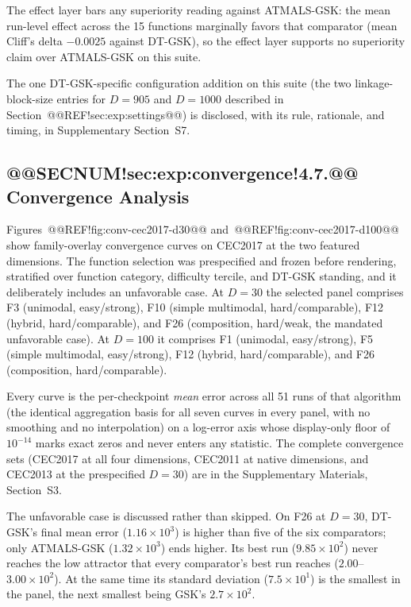 \documentclass[10pt,a4paper]{article}
\newcommand{\dtgsk}{DT-GSK}
\newcommand{\atmals}{ATMALS-GSK}
\begin{document}
The effect layer bars any superiority reading against \atmals{}: the
mean run-level effect across the 15 functions marginally favors that
comparator (mean Cliff's delta $-0.0025$ against \dtgsk{}), so the
effect layer supports no superiority claim over \atmals{} on this suite.

The one \dtgsk{}-specific configuration addition on this suite (the
two linkage-block-size entries for $D = 905$ and $D = 1000$ described in
Section~@@REF!sec:exp:settings@@) is disclosed, with its rule,
rationale, and timing, in Supplementary Section~S7.



\subsection{@@SECNUM!sec:exp:convergence!4.7.@@ Convergence Analysis}\label{sec:exp:convergence}


Figures~@@REF!fig:conv-cec2017-d30@@ and~@@REF!fig:conv-cec2017-d100@@
show family-overlay convergence curves on CEC2017 at the two featured
dimensions. The function selection was prespecified and frozen
before rendering, stratified over function category, difficulty tercile, and
\dtgsk{} standing, and it deliberately includes an unfavorable case.
At $D = 30$ the selected panel comprises F3 (unimodal, easy/strong),
F10 (simple multimodal, hard/comparable), F12 (hybrid, hard/comparable),
and F26 (composition, hard/weak, the mandated unfavorable case).
At $D = 100$ it comprises F1 (unimodal, easy/strong),
F5 (simple multimodal, easy/strong), F12 (hybrid, hard/comparable),
and F26 (composition, hard/comparable).

Every curve is the per-checkpoint \emph{mean} error across all 51
runs of that algorithm (the identical aggregation basis for all
seven curves in every panel, with no smoothing and no
interpolation) on a log-error axis whose display-only floor of
$10^{-14}$ marks exact zeros and never enters any statistic. The
complete convergence sets (CEC2017 at all four dimensions, CEC2011
at native dimensions, and CEC2013 at the prespecified $D = 30$) are
in the Supplementary Materials, Section~S3.


The unfavorable case is discussed rather than skipped. On F26 at
$D = 30$, \dtgsk{}'s final mean error ($1.16 \times 10^{3}$) is
higher than five of the six comparators; only \atmals{}
($1.32 \times 10^{3}$) ends higher. Its best run
($9.85 \times 10^{2}$) never reaches the low attractor that every
comparator's best run reaches ($2.00$--$3.00 \times 10^{2}$). At the
same time its standard deviation ($7.5 \times 10^{1}$) is the
smallest in the panel, the next smallest being GSK's
$2.7 \times 10^{2}$.
\end{document}
